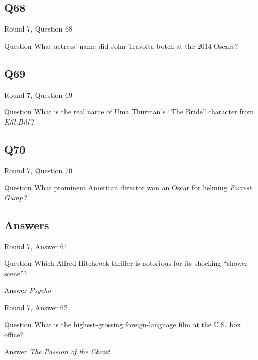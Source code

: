 \documentclass[11pt]{beamer}
\begin{document}
\subsection*{Q68}
\begin{frame}[t]{Round 7, Question 68}
\vspace{2em}
\begin{block}{Question}
What actress' name did John Travolta botch at the 2014 Oscars?
\end{block}
\end{frame}
    

\subsection*{Q69}
\begin{frame}[t]{Round 7, Question 69}
\vspace{2em}
\begin{block}{Question}
What is the real name of Uma Thurman's ``The Bride'' character from \emph{Kill Bill}\,?
\end{block}
\end{frame}
    

\subsection*{Q70}
\begin{frame}[t]{Round 7, Question 70}
\vspace{2em}
\begin{block}{Question}
What prominent American director won an Oscar for helming \emph{Forrest Gump}\,?
\end{block}
\end{frame}
    
\subsection{Answers}

\begin{frame}[t]{Round 7, Answer 61}
\vspace{2em}
\begin{block}{Question}
Which Alfred Hitchcock thriller is notorious for its shocking ``shower scene''?
\end{block}
\pause{}
\begin{block}{Answer}
\emph{Psycho}
\end{block}
\end{frame}
    

\begin{frame}[t]{Round 7, Answer 62}
\vspace{2em}
\begin{block}{Question}
What is the highest-grossing foreign-language film at the U.S. box office?
\end{block}
\pause{}
\begin{block}{Answer}
\emph{The Passion of the Christ}
\end{block}
\end{frame}
    
\end{document}
